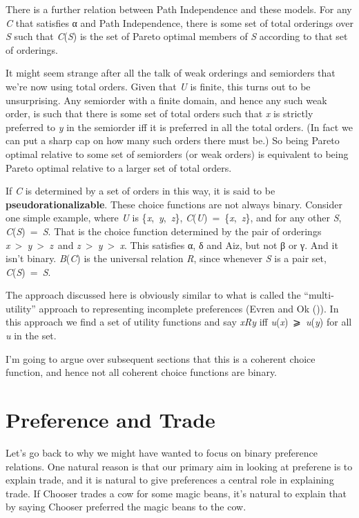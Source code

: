 \documentclass[
  11pt,
  letterpaper,
  DIV=11,
  numbers=noendperiod,
  twoside]{scrartcl}
\begin{document}
There is a further relation between Path Independence and these models.
For any \emph{C} that satisfies α and Path Independence, there is some
set of total orderings over \emph{S} such that \emph{C}(\emph{S}) is the
set of Pareto optimal members of \emph{S} according to that set of
orderings.

It might seem strange after all the talk of weak orderings and
semiorders that we're now using total orders. Given that \emph{U} is
finite, this turns out to be unsurprising. Any semiorder with a finite
domain, and hence any such weak order, is such that there is some set of
total orders such that \emph{x} is strictly preferred to \emph{y} in the
semiorder iff it is preferred in all the total orders. (In fact we can
put a sharp cap on how many such orders there must be.) So being Pareto
optimal relative to some set of semiorders (or weak orders) is
equivalent to being Pareto optimal relative to a larger set of total
orders.

If \emph{C} is determined by a set of orders in this way, it is said to
be \textbf{pseudorationalizable}. These choice functions are not always
binary. Consider one simple example, where \emph{U} is
\{\emph{x},~\emph{y},~\emph{z}\},
\emph{C}(\emph{U})~=~\{\emph{x},~\emph{z}\}, and for any other \emph{S},
\emph{C}(\emph{S})~=~\emph{S}. That is the choice function determined by
the pair of orderings
\emph{x}~\textgreater~\emph{y}~\textgreater~\emph{z}~and
\emph{z}~\textgreater~\emph{y}~\textgreater~\emph{x}. This satisfies α,
δ and Aiz, but not β or γ. And it isn't binary. \emph{B}(\emph{C}) is
the universal relation \emph{R}, since whenever \emph{S} is a pair set,
\emph{C}(\emph{S})~=~\emph{S}.

The approach discussed here is obviously similar to what is called the
``multi-utility'' approach to representing incomplete preferences (Evren
and Ok ()). In this approach we find a
set of utility functions and say \emph{xRy} iff
\emph{u}(\emph{x})~⩾~\emph{u}(\emph{y}) for all \emph{u} in the set.

I'm going to argue over subsequent sections that this is a coherent
choice function, and hence not all coherent choice functions are binary.

\section{Preference and Trade}\label{sec-trade}

Let's go back to why we might have wanted to focus on binary preference
relations. One natural reason is that our primary aim in looking at
preferene is to explain trade, and it is natural to give preferences a
central role in explaining trade. If Chooser trades a cow for some magic
beans, it's natural to explain that by saying Chooser preferred the
magic beans to the cow.
\end{document}
